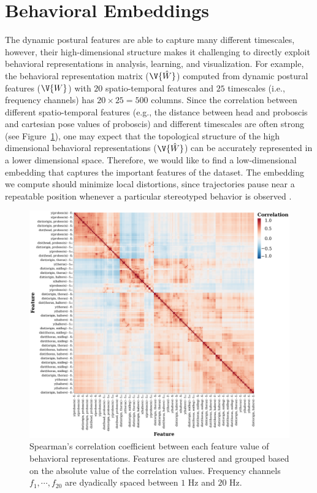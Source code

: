 \section{Behavioral Embeddings}\label{section:behavioral-embeddings}
The dynamic postural features are able to capture many different timescales, however, their high-dimensional structure makes it challenging to directly exploit behavioral representations in analysis, learning, and visualization.
For example, the behavioral representation matrix ($\V{\hat{W}}$) computed from dynamic postural features ($\V{W}$) with $20$ spatio-temporal features and $25$ timescales (i.e., frequency channels) has $20 \times 25 {=} 500$ columns.
Since the correlation between different spatio-temporal features (e.g., the distance between head and proboscis and cartesian pose values of proboscis) and different timescales are often strong (see Figure~\ref{figure:correlations-btw-features}), one may expect that the topological structure of the high dimensional behavioral representations ($\V{\hat{W}}$) can be accurately represented in a lower dimensional space.
Therefore, we would like to find a low-dimensional embedding that captures the important features of the dataset.
The embedding we compute should minimize local distortions, since trajectories pause near a repeatable position whenever a particular stereotyped behavior is observed \citep{berman_mapping_2014, deangelis_manifold_2019, ali_timecluster_2019}.

\begin{figure}[ht!]
	\centering
	\includegraphics[width=0.70\linewidth]{figures/FeatureCorrelations-FlyF1DAnn-XY_labels.pdf}
	\caption[Spearman's correlation coefficient between each feature value of behavioral representations.]{Spearman's correlation coefficient between each feature value of behavioral representations. Features are clustered and grouped based on the absolute value of the correlation values. Frequency channels $f_1, \cdots, f_20$ are dyadically spaced between $1$ Hz and $20$ Hz. \label{figure:correlations-btw-features}}
\end{figure}


